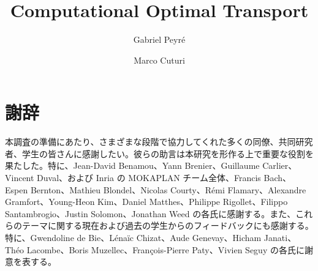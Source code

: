 \documentclass[uplatex,dvipdfmx]{jsreport}
\title{Computational Optimal Transport}
\author{Gabriel Peyr\'e \and Marco Cuturi}
\date{}
\begin{document}
\maketitle

\tableofcontents













\chapter*{謝辞}
本調査の準備にあたり、さまざまな段階で協力してくれた多くの同僚、共同研究者、学生の皆さんに感謝したい。彼らの助言は本研究を形作る上で重要な役割を果たした。特に、Jean-David Benamou、Yann Brenier、Guillaume Carlier、Vincent Duval、および Inria の MOKAPLAN チーム全体、Francis Bach、Espen Bernton、Mathieu Blondel、Nicolas Courty、R\'emi Flamary、Alexandre Gramfort、Young-Heon Kim、Daniel Matthes、Philippe Rigollet、Filippo Santambrogio、Justin Solomon、Jonathan Weed の各氏に感謝する。また、これらのテーマに関する現在および過去の学生からのフィードバックにも感謝する。特に、Gwendoline de Bie、L\'ena\"ic Chizat、Aude Genevay、Hicham Janati、Th\'eo Lacombe、Boris Muzellec、Fran\c{c}ois-Pierre Paty、Vivien Seguy の各氏に謝意を表する。



\end{document}
